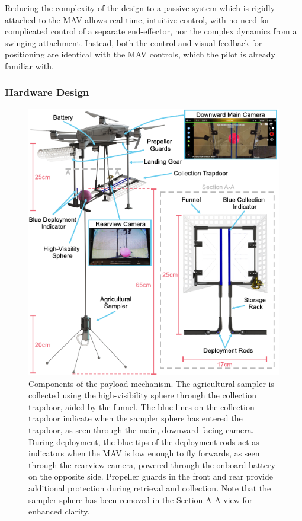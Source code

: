 Reducing the complexity of the design to a passive system which is rigidly attached to the \ac{MAV} allows real-time, intuitive control, with no need for complicated control of a separate end-effector, nor the complex dynamics from a swinging attachment. Instead, both the control and visual feedback for positioning are identical with the \ac{MAV} controls, which the pilot is already familiar with. 

\subsubsection{Hardware Design}
\begin{figure}[!tp]
\centering
\includegraphics[width=1\columnwidth]{chapters/papers/UR/figures/fig-2-hardware/fig-2-hardware.pdf}
\caption{Components of the payload mechanism. The agricultural sampler is collected using the high-visibility sphere through the collection trapdoor, aided by the funnel. The blue lines on the collection trapdoor indicate when the sampler sphere has entered the trapdoor, as seen through the main, downward facing camera. During deployment, the blue tips of the deployment rods act as indicators when the \ac{MAV} is low enough to fly forwards, as seen through the rearview camera, powered through the onboard battery on the opposite side. Propeller guards in the front and rear provide additional protection during retrieval and collection. Note that the sampler sphere has been removed in the Section A-A view for enhanced clarity.}
\label{fig:fig2-hardware}
\figurevspacebelow
\end{figure}

